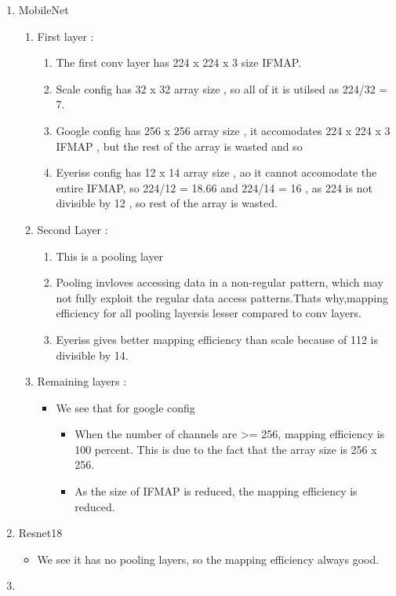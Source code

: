 \documentclass[12pt]{article}
\begin{document}
\begin{enumerate}
    \item MobileNet
    \begin{enumerate}
        \item First layer :
        \begin{enumerate}
            \item The first conv layer has 224 x 224 x 3 size IFMAP.
            \item Scale config has 32 x 32 array size , so all of it is utilsed  as 224/32 = 7.
            \item Google config has 256 x 256 array size , it accomodates 224 x 224 x 3 IFMAP , but the rest of the array is wasted and so
            \item Eyeriss config has 12 x 14 array size , ao it cannot accomodate the entire IFMAP, so 224/12 = 18.66 and 224/14 = 16 , as 224 is not divisible by 12 , so rest of the array is wasted.
        \end{enumerate}

        \item Second Layer :
        \begin{enumerate}
            \item This is a pooling layer
            \item Pooling invloves accessing data in a non-regular pattern, which may not fully exploit the regular data access patterns.Thats why,mapping efficiency for all pooling layersis lesser compared to conv layers.
            \item Eyeriss gives better mapping efficiency than scale because of 112 is divisible by 14.
        \end{enumerate}

        \item Remaining layers :
        \begin{itemize}
            \item We see that for google config 
            \begin{itemize}
                \item When the number of channels are >= 256, mapping efficiency is 100 percent. This is due to the fact that the array size is 256 x 256.
                \item As the size of IFMAP is reduced, the mapping efficiency is reduced.
            \end{itemize} 
        \end{itemize}
    \end{enumerate}

    \item Resnet18
        \begin{itemize}
            \item We see it has no pooling layers, so the mapping efficiency always good.
        \end{itemize}

    \item 

\end{enumerate}
\end{document}
